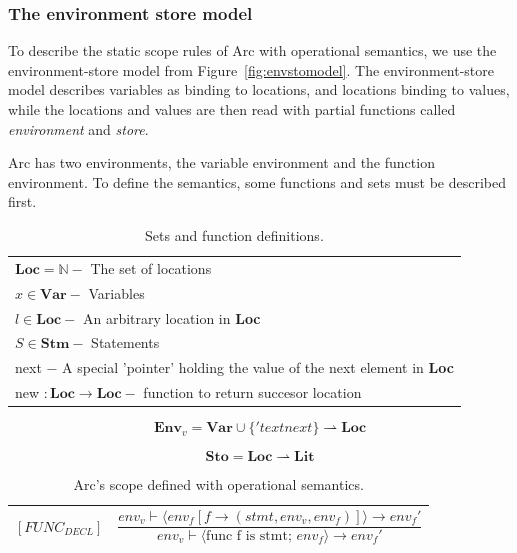\subsubsection{The environment store model}
To describe the static scope rules of Arc with operational semantics, we use the environment-store model from Figure~\ref{fig:envstomodel}. The environment-store model describes variables as binding to locations, and locations binding to values, while the locations and values are then read with partial functions called \textit{environment} and \textit{store}.

Arc has two environments, the variable environment and the function environment. To define the semantics, some functions and sets must be described first.

\begin{table}[htbp]
  \centering
  \begin{tabular}{l}
    \toprule
    $\textbf{Loc} = \mathbb{N} - $ The set of locations                                   \\
    $x \in \textbf{Var} - $ Variables                                                     \\
    $l \in \textbf{Loc} - $ An arbitrary location in \textbf{Loc}                         \\
    $S \in \textbf{Stm} - $ Statements                                                    \\
    next $- $ A special 'pointer' holding the value of the next element in \textbf{Loc}   \\
    new $: \textbf{Loc} \rightarrow \textbf{Loc} - $ function to return succesor location \\
    \bottomrule
  \end{tabular}
  \caption{Sets and function definitions.}
  \label{tab:setsandfunctions}
\end{table}


\begin{equation}\label{eq:environmentset}
  \textbf{Env}_v = \textbf{Var} \cup \{'text{next}\} \rightharpoonup \textbf{Loc}
\end{equation}

\begin{equation}\label{eq:storeset}
  \textbf{Sto} = \textbf{Loc} \rightharpoonup \textbf{Lit}
\end{equation}



\begin{table}[htbp]
  \centering
  \begin{tabular}{ll}
    \toprule
    $[FUNC_{DECL}] $ & $\dfrac
      {env_v \vdash \langle env_f[f \to (stmt, env_v, env_f)] \rangle \to env_f \prime}
      {env_v \vdash \langle \text{func f is stmt; } env_f \rangle \to env_f \prime}$ \\
    \bottomrule
  \end{tabular}
  \caption{Arc's scope defined with operational semantics.}
  \label{tab:arcscoperules}
\end{table}

